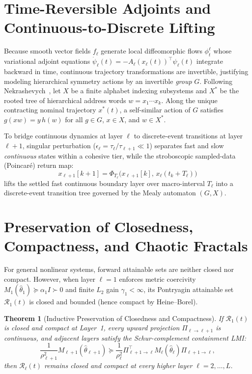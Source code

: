 \documentclass[journal]{IEEEtran}
\newtheorem{theorem}{Theorem}
\begin{document}
\section{Time-Reversible Adjoints and Continuous-to-Discrete Lifting}
Because smooth vector fields $f_\ell$ generate local diffeomorphic flows $\phi_t^\ell$ whose variational adjoint equations $\dot{\psi}_\ell(t) = -A_\ell(x_\ell(t))^\top \psi_\ell(t)$ integrate backward in time, continuous trajectory transformations are invertible, justifying modeling hierarchical symmetry actions by an invertible \emph{group} $G$. Following Nekrashevych~\cite{nekrashevych05}, let $X$ be a finite alphabet indexing subsystems and $X^*$ be the rooted tree of hierarchical address words $w = x_1 \cdots x_k$. Along the unique contracting nominal trajectory $x^*(t)$, a self-similar action of $G$ satisfies $g(xw) = y\,h(w)$ for all $g \in G$, $x \in X$, and $w \in X^*$.

To bridge continuous dynamics at layer $\ell$ to discrete-event transitions at layer $\ell+1$, singular perturbation ($\epsilon_\ell = \tau_\ell / \tau_{\ell+1} \ll 1$) separates fast and slow \emph{continuous} states within a cohesive tier, while the stroboscopic sampled-data (Poincar\'e) return map:
\begin{equation}
x_{\ell+1}[k+1] = \Phi_{T_\ell}\big(x_{\ell+1}[k],\, x_\ell(t_k + T_\ell)\big)
\end{equation}
lifts the settled fast continuous boundary layer over macro-interval $T_\ell$ into a discrete-event transition tree governed by the Mealy automaton $(G, X)$.

\section{Preservation of Closedness, Compactness, and Chaotic Fractals}
For general nonlinear systems, forward attainable sets are neither closed nor compact. However, when layer $\ell = 1$ enforces metric coercivity $M_1(\hat{\theta}_1) \succeq \alpha_1 I \succ 0$ and finite $L_2$ gain $\gamma_1 < \infty$, its Pontryagin attainable set $\mathcal{R}_1(t)$ is closed and bounded (hence compact by Heine--Borel).

\begin{theorem}[Inductive Preservation of Closedness and Compactness]
If $\mathcal{R}_1(t)$ is closed and compact at Layer~1, every upward projection $\Pi_{\ell \to \ell+1}$ is continuous, and adjacent layers satisfy the Schur-complement containment LMI:
\begin{equation}
\frac{1}{\rho_{\ell+1}^2} M_{\ell+1}(\hat{\theta}_{\ell+1}) \succeq \frac{1}{\rho_\ell^2} \Pi_{\ell+1 \to \ell}^\top M_\ell(\hat{\theta}_\ell) \Pi_{\ell+1 \to \ell},
\end{equation}
then $\mathcal{R}_\ell(t)$ remains closed and compact at every higher layer $\ell = 2, \dots, L$.
\end{theorem}
\end{document}
